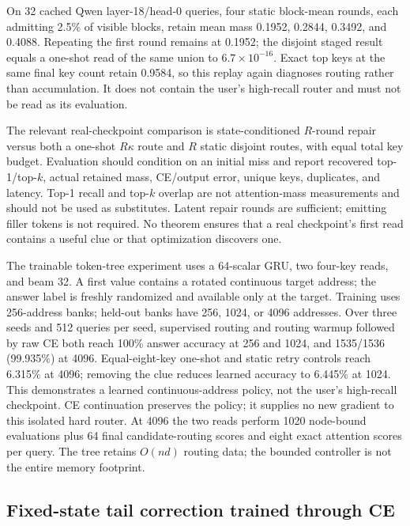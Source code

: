 \documentclass[11pt]{article}
\numberwithin{equation}{section}
\begin{document}
On 32 cached Qwen layer-18/head-0 queries, four static block-mean rounds, each admitting 2.5\% of visible
blocks, retain mean mass 0.1952, 0.2844, 0.3492, and 0.4088. Repeating the first round remains at 0.1952;
the disjoint staged result equals a one-shot read of the same union to $6.7\times10^{-16}$. Exact top keys at
the same final key count retain 0.9584, so this replay again diagnoses routing rather than accumulation. It
does not contain the user's high-recall router and must not be read as its evaluation.

The relevant real-checkpoint comparison is state-conditioned $R$-round repair versus both a one-shot
$R\kappa$ route and $R$ static disjoint routes, with equal total key budget. Evaluation should condition on
an initial miss and report recovered top-1/top-$k$, actual retained mass, CE/output error, unique keys,
duplicates, and latency. Top-1 recall and top-$k$ overlap are not attention-mass measurements and should not
be used as substitutes. Latent repair rounds are sufficient; emitting filler tokens is not required. No
theorem ensures that a real checkpoint's first read contains a useful clue or that optimization discovers one.

The trainable token-tree experiment uses a 64-scalar GRU, two four-key reads, and beam 32. A first value
contains a rotated continuous target address; the answer label is freshly randomized and available only at
the target. Training uses 256-address banks; held-out banks have 256, 1024, or 4096 addresses. Over three seeds
and 512 queries per seed, supervised routing and routing warmup followed by raw CE both reach 100\% answer
accuracy at 256 and 1024, and 1535/1536 (99.935\%) at 4096. Equal-eight-key one-shot and static retry controls
reach 6.315\% at 4096; removing the clue reduces learned accuracy to 6.445\% at 1024. This demonstrates a
learned continuous-address policy, not the user's high-recall checkpoint. CE continuation preserves the
policy; it supplies no new gradient to this isolated hard router. At 4096 the two reads perform 1020
node-bound evaluations plus 64 final candidate-routing scores and eight exact attention scores per query.
The tree retains $O(nd)$ routing data; the bounded controller is not the entire memory footprint.

\subsection{Fixed-state tail correction trained through CE}
\end{document}
